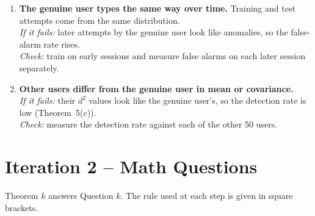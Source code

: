 \documentclass[11pt]{article}
\theoremstyle{plain}
\theoremstyle{definition}
\theoremstyle{remark}
\begin{document}
\begin{enumerate}[label=\textbf{A\arabic*.},leftmargin=*,itemsep=8pt]
\item \textbf{The genuine user types the same way over time.} Training and test
  attempts come from the same distribution.\\
  \textit{If it fails:} later attempts by the genuine user look like anomalies, so the
  false-alarm rate rises.\\
  \textit{Check:} train on early sessions and measure false alarms on each later
  session separately.

\item \textbf{Other users differ from the genuine user in mean or covariance.}\\
  \textit{If it fails:} their $d^2$ values look like the genuine user's, so the
  detection rate is low (Theorem~5(c)).\\
  \textit{Check:} measure the detection rate against each of the other 50 users.
\end{enumerate}

\clearpage
\section{Iteration 2 -- Math Questions}\label{sec:questions}
Theorem $k$ answers Question $k$. The rule used at each step is given in square
brackets.

\end{document}
